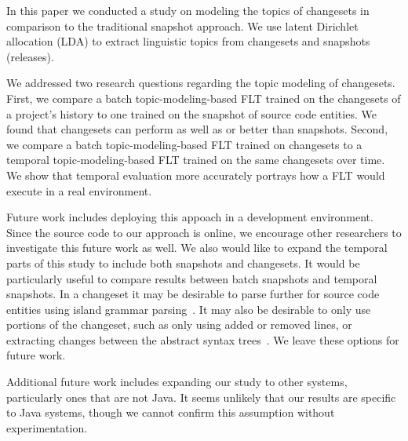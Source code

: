 
In this paper we conducted a study on modeling the topics of changesets in
comparison to the traditional snapshot approach.  We use latent Dirichlet
allocation (LDA) to extract linguistic topics from changesets and snapshots
(releases).

We addressed two research questions regarding the topic modeling of changesets.
First, we compare a batch topic-modeling-based FLT trained on the changesets of
a project's history to one trained on the snapshot of source code entities.  We
found that changesets can perform as well as or better than snapshots.  Second,
we compare a batch topic-modeling-based FLT trained on changesets to a temporal
topic-modeling-based FLT trained on the same changesets over time.  We show that
temporal evaluation more accurately portrays how a FLT would execute in a real
environment.


Future work includes deploying this appoach in a development environment.  Since
the source code to our approach is online, we encourage other researchers to
investigate this future work as well.  We also would like to expand the temporal
parts of this study to include both snapshots and changesets.  It would be
particularly useful to compare results between batch snapshots and temporal
snapshots.  In a changeset it may be desirable to parse further for source code
entities using island grammar parsing~\cite{Moonen:2001}.  It may also be
desirable to only use portions of the changeset, such as only using added or
removed lines, or extracting changes between the abstract syntax
trees~\cite{Fluri-etal:2007}.  We leave these options for future work.

Additional future work includes expanding our study to other systems,
particularly ones that are not Java.  It seems unlikely that our results are
specific to Java systems, though we cannot confirm this assumption without
experimentation.

